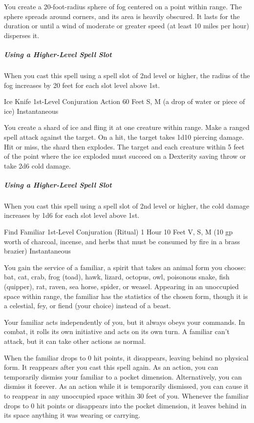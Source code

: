 \documentclass[letterpaper,openany,oneside,twocolumn]{book}
\begin{document}
You create a 20-foot-radius sphere of fog centered on a point within range. The sphere spreads around corners, and its area is heavily obscured. It lasts for the duration or until a wind of moderate or greater speed (at least 10 miles per hour) disperses it.

\subparagraph*{Using a Higher-Level Spell Slot} When you cast this spell using a spell slot of 2nd level or higher, the radius of the fog increases by 20 feet for each slot level above 1st.

\DndSpellHeader
  {Ice Knife}
  {1st-Level Conjuration}
  {Action}
  {60 Feet}
  {S, M (a drop of water or piece of ice)}
  {Instantaneous}

You create a shard of ice and fling it at one creature within range. Make a ranged spell attack against the target. On a hit, the target takes 1d10 piercing damage. Hit or miss, the shard then explodes. The target and each creature within 5 feet of the point where the ice exploded must succeed on a Dexterity saving throw or take 2d6 cold damage.

\subparagraph*{Using a Higher-Level Spell Slot} When you cast this spell using a spell slot of 2nd level or higher, the cold damage increases by 1d6 for each slot level above 1st.

\DndSpellHeader
  {Find Familiar}
  {1st-Level Conjuration (Ritual)}
  {1 Hour}
  {10 Feet}
  {V, S, M (10 gp worth of charcoal, incense, and herbs that must be consumed by fire in a brass brazier)}
  {Instantaneous}

You gain the service of a familiar, a spirit that takes an animal form you choose: bat, cat, crab, frog (toad), hawk, lizard, octopus, owl, poisonous snake, fish (quipper), rat, raven, sea horse, spider, or weasel. Appearing in an unoccupied space within range, the familiar has the statistics of the chosen form, though it is a celestial, fey, or fiend (your choice) instead of a beast.

Your familiar acts independently of you, but it always obeys your commands. In combat, it rolls its own initiative and acts on its own turn. A familiar can't attack, but it can take other actions as normal.

When the familiar drops to 0 hit points, it disappears, leaving behind no physical form. It reappears after you cast this spell again. As an action, you can temporarily dismiss your familiar to a pocket dimension. Alternatively, you can dismiss it forever. As an action while it is temporarily dismissed, you can cause it to reappear in any unoccupied space within 30 feet of you. Whenever the familiar drops to 0 hit points or disappears into the pocket dimension, it leaves behind in its space anything it was wearing or carrying.
\end{document}
